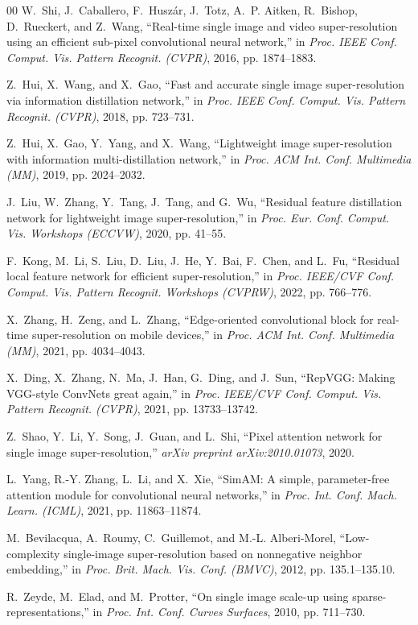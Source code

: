 \documentclass[conference]{IEEEtran}
\begin{document}
\begin{thebibliography}{00}
W.~Shi, J.~Caballero, F.~Husz{\'a}r, J.~Totz, A.~P. Aitken, R.~Bishop, D.~Rueckert, and Z.~Wang,
``Real-time single image and video super-resolution using an efficient sub-pixel convolutional neural network,''
in \emph{Proc. IEEE Conf. Comput. Vis. Pattern Recognit. (CVPR)}, 2016, pp. 1874--1883.

Z.~Hui, X.~Wang, and X.~Gao,
``Fast and accurate single image super-resolution via information distillation network,''
in \emph{Proc. IEEE Conf. Comput. Vis. Pattern Recognit. (CVPR)}, 2018, pp. 723--731.

Z.~Hui, X.~Gao, Y.~Yang, and X.~Wang,
``Lightweight image super-resolution with information multi-distillation network,''
in \emph{Proc. ACM Int. Conf. Multimedia (MM)}, 2019, pp. 2024--2032.

J.~Liu, W.~Zhang, Y.~Tang, J.~Tang, and G.~Wu,
``Residual feature distillation network for lightweight image super-resolution,''
in \emph{Proc. Eur. Conf. Comput. Vis. Workshops (ECCVW)}, 2020, pp. 41--55.

F.~Kong, M.~Li, S.~Liu, D.~Liu, J.~He, Y.~Bai, F.~Chen, and L.~Fu,
``Residual local feature network for efficient super-resolution,''
in \emph{Proc. IEEE/CVF Conf. Comput. Vis. Pattern Recognit. Workshops (CVPRW)}, 2022, pp. 766--776.

X.~Zhang, H.~Zeng, and L.~Zhang,
``Edge-oriented convolutional block for real-time super-resolution on mobile devices,''
in \emph{Proc. ACM Int. Conf. Multimedia (MM)}, 2021, pp. 4034--4043.

X.~Ding, X.~Zhang, N.~Ma, J.~Han, G.~Ding, and J.~Sun,
``RepVGG: Making VGG-style ConvNets great again,''
in \emph{Proc. IEEE/CVF Conf. Comput. Vis. Pattern Recognit. (CVPR)}, 2021, pp. 13733--13742.

Z.~Shao, Y.~Li, Y.~Song, J.~Guan, and L.~Shi,
``Pixel attention network for single image super-resolution,''
\emph{arXiv preprint arXiv:2010.01073}, 2020.

L.~Yang, R.-Y. Zhang, L.~Li, and X.~Xie,
``SimAM: A simple, parameter-free attention module for convolutional neural networks,''
in \emph{Proc. Int. Conf. Mach. Learn. (ICML)}, 2021, pp. 11863--11874.

M.~Bevilacqua, A.~Roumy, C.~Guillemot, and M.-L. Alberi-Morel,
``Low-complexity single-image super-resolution based on nonnegative neighbor embedding,''
in \emph{Proc. Brit. Mach. Vis. Conf. (BMVC)}, 2012, pp. 135.1--135.10.

R.~Zeyde, M.~Elad, and M.~Protter,
``On single image scale-up using sparse-representations,''
in \emph{Proc. Int. Conf. Curves Surfaces}, 2010, pp. 711--730.

\end{thebibliography}
\end{document}

